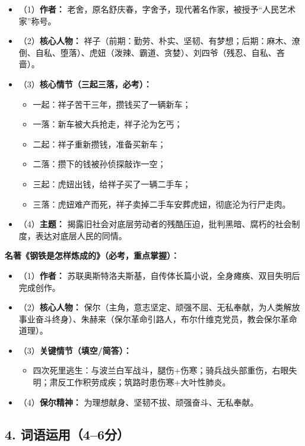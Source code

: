 \begin{itemize}[leftmargin=*]
    \item （1）\textbf{作者：} 老舍，原名舒庆春，字舍予，现代著名作家，被授予“人民艺术家”称号。
    \item （2）\textbf{核心人物：} 祥子（前期：勤劳、朴实、坚韧、有梦想；后期：麻木、潦倒、自私、堕落）、虎妞（泼辣、霸道、贪婪）、刘四爷（残忍、自私、吝啬）。
    \item （3）\textbf{核心情节（三起三落，必考）：}
        \begin{itemize}
            \item 一起：祥子苦干三年，攒钱买了一辆新车；
            \item 一落：新车被大兵抢走，祥子沦为乞丐；
            \item 二起：祥子重新攒钱，准备买新车；
            \item 二落：攒下的钱被孙侦探敲诈一空；
            \item 三起：虎妞出钱，给祥子买了一辆二手车；
            \item 三落：虎妞难产而死，祥子卖掉二手车安葬虎妞，彻底沦为行尸走肉。
        \end{itemize}
    \item （4）\textbf{主题：} 揭露旧社会对底层劳动者的残酷压迫，批判黑暗、腐朽的社会制度，表达对底层人民的同情。
\end{itemize}

\textbf{名著《钢铁是怎样炼成的》（必考，重点掌握）：}

\begin{itemize}[leftmargin=*]
    \item （1）\textbf{作者：} 苏联奥斯特洛夫斯基，自传体长篇小说，全身瘫痪、双目失明后完成创作。
    \item （2）\textbf{核心人物：} 保尔（主角，意志坚定、顽强不屈、无私奉献，为人类解放事业奋斗终身）、朱赫来（保尔革命引路人，布尔什维克党员，教会保尔革命道理）。
    \item （3）\textbf{关键情节（填空/简答）：}
        \begin{itemize}
            \item 四次死里逃生：与波兰白军战斗，腿伤+伤寒；骑兵战头部重伤，右眼失明；肃反工作积劳成疾；筑路时患伤寒+大叶性肺炎。
        \end{itemize}
    \item （4）\textbf{保尔精神：} 为理想献身、坚韧不拔、顽强奋斗、无私奉献。
\end{itemize}

\subsection*{4. 词语运用（4--6分）}

